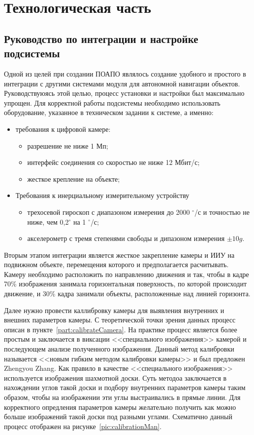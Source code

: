 \newpage
\section{Технологическая часть}

\subsection{Руководство по интеграции и настройке подсистемы}
Одной из целей при создании ПОАПО являлось создание удобного и простого в интеграции с другими системами модуля для автономной навигации объектов. Руководствуюясь этой целью, процесс установки и настройки был максимально упрощен. 
Для корректной работы подсистемы необходимо использовать оборудование, указанное в техническом задании к системе, а именно:
\begin{itemize}
\item требования к цифровой камере:
	\begin{itemize}
	\item разрешение не ниже 1 Мп;
	\item интерфейс соединения со скоростью не ниже 12 Мбит/с;
	\item жесткое крепление на объекте;
	\end{itemize}
\item Требования к инерциальному измерительному устройству 
 	\begin{itemize}
 	\item трехосевой гироскоп с диапазоном измерения до 2000 $^\circ$/с и точностью не ниже, чем 0,2$^\circ$ на 1 $^\circ$/с;
	\item акселерометр с тремя степенями свободы и дипазоном измерения $\pm10g$.
 	\end{itemize}
\end{itemize}

Вторым этапом интеграции является жесткое закрепление камеры и ИИУ на подвижном объекте, перемещения которого и предполагается расчитывать. Камеру необходимо расположить по направлению движения и так, чтобы в кадре 70\% изображения занимала горизонтальная поверхность, по которой происходит движение, и 30\% кадра занимали объекты, расположенные над линией горизонта.  

Далее нужно провести каллибровку камеры для выявления внутренних и внешних параметров камеры. С теоретической точки зрения данных процесс описан в пункте~\ref{part:calibrateCamera}. На практике процесс является более простым и заключается в виксации <<специального изображения>> камерой и последующем анализе полученного изображения. Данный метод калибровки называется <<новым гибким методом калибровки камеры>> и был предложен Zhengyou Zhang\cite{Zhang}. Как правило в качестве <<специального изображения>> используется изображения шахмотной доски. Суть методоа заключается в нахождении углов такой доски и подбору внутренних параметров камеры таким образом, чтобы на изображении эти углы выстраивались в прямые линии. Для корректного опредления параметров камеры желательно получить как можно больше изображений такой доски под разными углами. Схематично данный процесс отображен на рисунке~\ref{pic:calibrationMan}.

